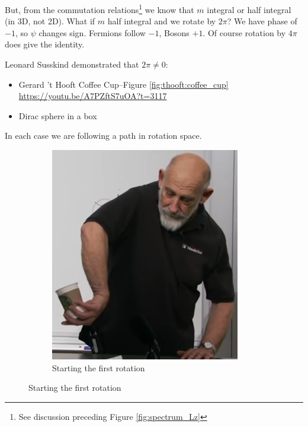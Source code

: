 \documentclass[]{article}
\begin{document}
But, from the commutation relations\footnote{See discussion preceding Figure \ref{fig:spectrum_Lz}} we know that  $m$ integral or half integral (in 3D, not 2D).
What if $m$ half integral and we rotate by $2\pi$? We have phase of $-1$, so $\psi$ changes sign. Fermions follow $-1$, Bosons $+1$. Of course rotation by  $4\pi$ does give the identity.

Leonard Susskind demonstrated that $2\pi\ne0$:
\begin{itemize}
	\item Gerard 't Hooft Coffee Cup--Figure \ref{fig:thooft:coffee_cup} \url{https://youtu.be/A7PZftS7uOA?t=3117}
	\item Dirac sphere in a box
\end{itemize}
In each case we are following a path in rotation space.

\begin{figure}[H]
	\caption{Leonard Susskind demonstrating the Gerard 't Hooft Coffee Cup trick}\label{fig:thooft:coffee_cup}
	\begin{subfigure}{0.45\textwidth}
		\caption{Starting the first rotation}
		\includegraphics[width=\textwidth]{aqm-5-coffee-cup1}
	\end{subfigure}

\end{figure}
\end{document}
